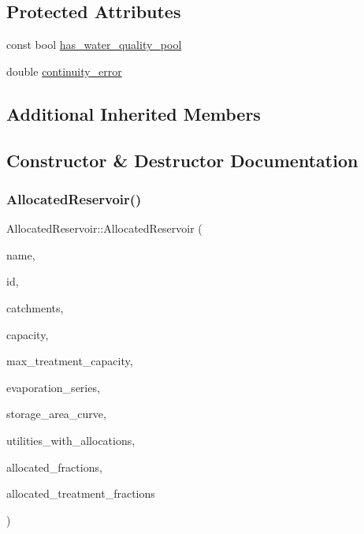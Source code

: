 \subsection*{Protected Attributes}
\begin{DoxyCompactItemize}
\item 
const bool \mbox{\hyperlink{classAllocatedReservoir_af6a1924f60de19b7f77781af0419c39b_af6a1924f60de19b7f77781af0419c39b}{has\+\_\+water\+\_\+quality\+\_\+pool}}
\item 
double \mbox{\hyperlink{classAllocatedReservoir_ae34d7123ff096d676609e32ba4b83e47_ae34d7123ff096d676609e32ba4b83e47}{continuity\+\_\+error}}
\end{DoxyCompactItemize}
\subsection*{Additional Inherited Members}


\subsection{Constructor \& Destructor Documentation}
\mbox{\label{classAllocatedReservoir_a0b2d620a1d1fe9a9fe053269f35a9a70_a0b2d620a1d1fe9a9fe053269f35a9a70}} 
\subsubsection{\texorpdfstring{Allocated\+Reservoir()}{AllocatedReservoir()}\hspace{0.1cm}{\footnotesize\ttfamily [1/5]}}
{\footnotesize\ttfamily Allocated\+Reservoir\+::\+Allocated\+Reservoir (\begin{DoxyParamCaption}\item[{const char $\ast$}]{name,  }\item[{const int}]{id,  }\item[{const vector$<$ \mbox{\hyperlink{classCatchment}{Catchment}} $\ast$$>$ \&}]{catchments,  }\item[{const double}]{capacity,  }\item[{const double}]{max\+\_\+treatment\+\_\+capacity,  }\item[{\mbox{\hyperlink{classEvaporationSeries}{Evaporation\+Series}} \&}]{evaporation\+\_\+series,  }\item[{\mbox{\hyperlink{classDataSeries}{Data\+Series}} $\ast$}]{storage\+\_\+area\+\_\+curve,  }\item[{vector$<$ int $>$ $\ast$}]{utilities\+\_\+with\+\_\+allocations,  }\item[{vector$<$ double $>$ $\ast$}]{allocated\+\_\+fractions,  }\item[{vector$<$ double $>$ $\ast$}]{allocated\+\_\+treatment\+\_\+fractions }\end{DoxyParamCaption})}

